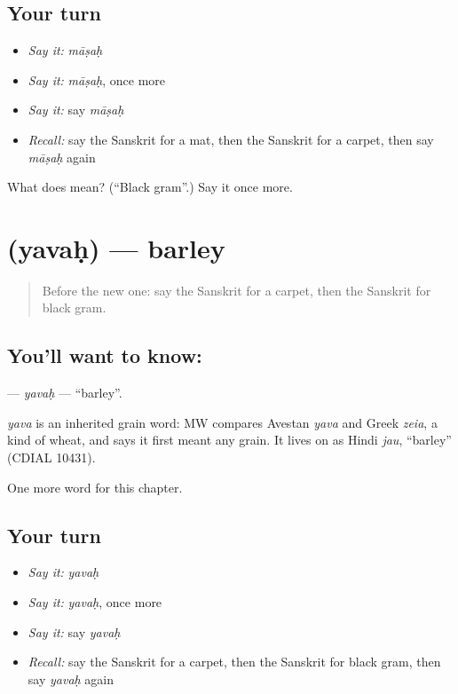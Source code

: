 \subsection*{Your turn}
\begin{itemize}
\raggedright
  \item \emph{Say it:} \emph{māṣaḥ}
  \item \emph{Say it:} \emph{māṣaḥ}, once more
  \item \emph{Say it:} say \emph{māṣaḥ}
  \item \emph{Recall:} say the Sanskrit for a mat, then the Sanskrit for a carpet, then say \emph{māṣaḥ} again
\end{itemize}

\begin{tcolorbox}[breakable,colback=teal!4,colframe=teal!35!black,title={Before you move on}]
What does  mean? (\textquotedblleft{}Black gram\textquotedblright{}.) Say it once more.
\end{tcolorbox}
\section[\texorpdfstring{\sk{यवः} (yavaḥ)}{यवः (yavaḥ)}]{ (yavaḥ) — barley}

\label{lesson:SA-C190-yavah}



\begin{quote}
Before the new one: say the Sanskrit for a carpet, then the Sanskrit for black gram.
\end{quote}

\subsection*{You'll want to know: }
\textbf{} — \emph{yavaḥ} — \textquotedblleft{}barley\textquotedblright{}.

\begin{cousinweb}
\emph{yava} is an inherited grain word: MW compares Avestan \emph{yava} and Greek \emph{zeia}, a kind of wheat, and says it first meant any grain. It lives on as Hindi \emph{jau}, \textquotedblleft{}barley\textquotedblright{} (CDIAL 10431).
\end{cousinweb}

\begin{grammarlens}[title={What you've built}]
One more word for this chapter.
\end{grammarlens}

\subsection*{Your turn}
\begin{itemize}
\raggedright
  \item \emph{Say it:} \emph{yavaḥ}
  \item \emph{Say it:} \emph{yavaḥ}, once more
  \item \emph{Say it:} say \emph{yavaḥ}
  \item \emph{Recall:} say the Sanskrit for a carpet, then the Sanskrit for black gram, then say \emph{yavaḥ} again
\end{itemize}

